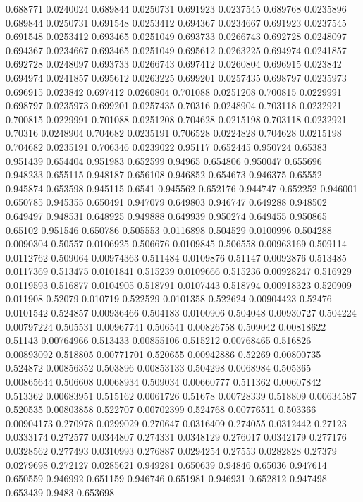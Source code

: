 0.688771 0.0240024
0.689844 0.0250731
0.691923 0.0237545
0.689768 0.0235896
0.689844 0.0250731
0.691548 0.0253412
0.694367 0.0234667
0.691923 0.0237545
0.691548 0.0253412
0.693465 0.0251049
0.693733 0.0266743
0.692728 0.0248097
0.694367 0.0234667
0.693465 0.0251049
0.695612 0.0263225
0.694974 0.0241857
0.692728 0.0248097
0.693733 0.0266743
0.697412 0.0260804
0.696915 0.023842
0.694974 0.0241857
0.695612 0.0263225
0.699201 0.0257435
0.698797 0.0235973
0.696915 0.023842
0.697412 0.0260804
0.701088 0.0251208
0.700815 0.0229991
0.698797 0.0235973
0.699201 0.0257435
0.70316 0.0248904
0.703118 0.0232921
0.700815 0.0229991
0.701088 0.0251208
0.704628 0.0215198
0.703118 0.0232921
0.70316 0.0248904
0.704682 0.0235191
0.706528 0.0224828
0.704628 0.0215198
0.704682 0.0235191
0.706346 0.0239022
0.95117 0.652445
0.950724 0.65383
0.951439 0.654404
0.951983 0.652599
0.94965 0.654806
0.950047 0.655696
0.948233 0.655115
0.948187 0.656108
0.946852 0.654673
0.946375 0.65552
0.945874 0.653598
0.945115 0.6541
0.945562 0.652176
0.944747 0.652252
0.946001 0.650785
0.945355 0.650491
0.947079 0.649803
0.946747 0.649288
0.948502 0.649497
0.948531 0.648925
0.949888 0.649939
0.950274 0.649455
0.950865 0.65102
0.951546 0.650786
0.505553 0.0116898
0.504529 0.0100996
0.504288 0.0090304
0.50557 0.0106925
0.506676 0.0109845
0.506558 0.00963169
0.509114 0.0112762
0.509064 0.00974363
0.511484 0.0109876
0.51147 0.0092876
0.513485 0.0117369
0.513475 0.0101841
0.515239 0.0109666
0.515236 0.00928247
0.516929 0.0119593
0.516877 0.0104905
0.518791 0.0107443
0.518794 0.00918323
0.520909 0.011908
0.52079 0.010719
0.522529 0.0101358
0.522624 0.00904423
0.52476 0.0101542
0.524857 0.00936466
0.504183 0.0100906
0.504048 0.00930727
0.504224 0.00797224
0.505531 0.00967741
0.506541 0.00826758
0.509042 0.00818622
0.51143 0.00764966
0.513433 0.00855106
0.515212 0.00768465
0.516826 0.00893092
0.518805 0.00771701
0.520655 0.00942886
0.52269 0.00800735
0.524872 0.00856352
0.503896 0.00853133
0.504298 0.0068984
0.505365 0.00865644
0.506608 0.0068934
0.509034 0.00660777
0.511362 0.00607842
0.513362 0.00683951
0.515162 0.0061726
0.51678 0.00728339
0.518809 0.00634587
0.520535 0.00803858
0.522707 0.00702399
0.524768 0.00776511
0.503366 0.00904173
0.270978 0.0299029
0.270647 0.0316409
0.274055 0.0312442
0.27123 0.0333174
0.272577 0.0344807
0.274331 0.0348129
0.276017 0.0342179
0.277176 0.0328562
0.277493 0.0310993
0.276887 0.0294254
0.27553 0.0282828
0.27379 0.0279698
0.272127 0.0285621
0.949281 0.650639
0.94846 0.65036
0.947614 0.650559
0.946992 0.651159
0.946746 0.651981
0.946931 0.652812
0.947498 0.653439
0.9483 0.653698
